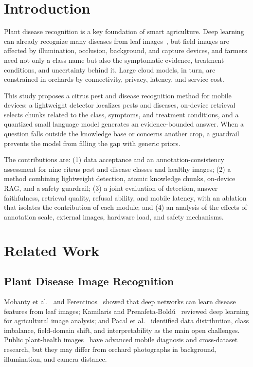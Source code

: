 \documentclass[10pt,twocolumn,a4paper]{article}
\begin{document}
\section{Introduction}
Plant disease recognition is a key foundation of smart agriculture. Deep learning can already recognize many diseases from leaf images~\cite{mohanty2016,ferentinos2018,kamilaris2018,pacal2024}, but field images are affected by illumination, occlusion, background, and capture devices, and farmers need not only a class name but also the symptomatic evidence, treatment conditions, and uncertainty behind it. Large cloud models, in turn, are constrained in orchards by connectivity, privacy, latency, and service cost.

This study proposes a citrus pest and disease recognition method for mobile devices: a lightweight detector localizes pests and diseases, on-device retrieval selects chunks related to the class, symptoms, and treatment conditions, and a quantized small language model generates an evidence-bounded answer. When a question falls outside the knowledge base or concerns another crop, a guardrail prevents the model from filling the gap with generic priors.

The contributions are: (1) data acceptance and an annotation-consistency assessment for nine citrus pest and disease classes and healthy images; (2) a method combining lightweight detection, atomic knowledge chunks, on-device RAG, and a safety guardrail; (3) a joint evaluation of detection, answer faithfulness, retrieval quality, refusal ability, and mobile latency, with an ablation that isolates the contribution of each module; and (4) an analysis of the effects of annotation scale, external images, hardware load, and safety mechanisms.

\section{Related Work}
\subsection{Plant Disease Image Recognition}
Mohanty et al.~\cite{mohanty2016} and Ferentinos~\cite{ferentinos2018} showed that deep networks can learn disease features from leaf images; Kamilaris and Prenafeta-Boldú~\cite{kamilaris2018} reviewed deep learning for agricultural image analysis; and Pacal et al.~\cite{pacal2024} identified data distribution, class imbalance, field-domain shift, and interpretability as the main open challenges. Public plant-health images~\cite{hughes2015} have advanced mobile diagnosis and cross-dataset research, but they may differ from orchard photographs in background, illumination, and camera distance.
\end{document}
